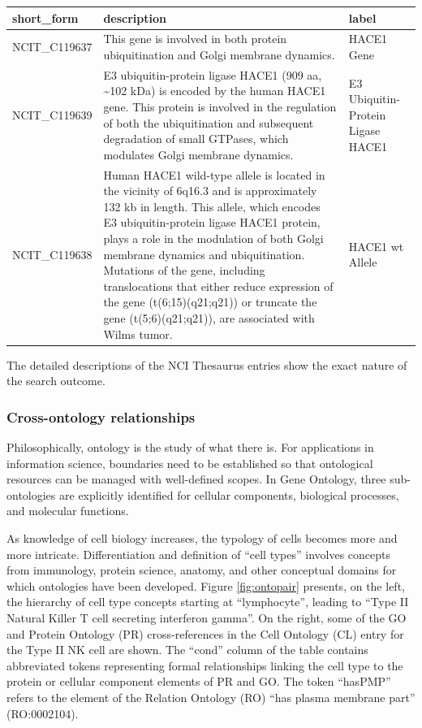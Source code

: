 \begin{tabular}[t]{l>{\raggedright\arraybackslash}p{15em}>{\raggedright\arraybackslash}p{15em}}
\toprule
short\_form & description & label\\
\midrule
NCIT\_C119637 & This gene is involved in both protein ubiquitination and Golgi membrane dynamics. & HACE1 Gene\\
NCIT\_C119639 & E3 ubiquitin-protein ligase HACE1 (909 aa, \textasciitilde{}102 kDa) is encoded by the human HACE1 gene. This protein is involved in the regulation of both the ubiquitination and subsequent degradation of small GTPases, which modulates Golgi membrane dynamics. & E3 Ubiquitin-Protein Ligase HACE1\\
NCIT\_C119638 & Human HACE1 wild-type allele is located in the vicinity of 6q16.3 and is approximately 132 kb in length. This allele, which encodes E3 ubiquitin-protein ligase HACE1 protein, plays a role in the modulation of both Golgi membrane dynamics and ubiquitination. Mutations of the gene, including translocations that either reduce expression of the gene (t(6;15)(q21;q21)) or truncate the gene (t(5;6)(q21;q21)), are associated with Wilms tumor. & HACE1 wt Allele\\
\bottomrule
\end{tabular}

The detailed descriptions of the NCI Thesaurus entries show
the exact nature of the search outcome.

\subsubsection{Cross-ontology relationships}\label{cross-ontology-relationships}

Philosophically, ontology is the study of what there is. For
applications in information
science,
boundaries need to be established so that ontological
resources can be managed with well-defined scopes. In Gene
Ontology, three sub-ontologies are explicitly identified for
cellular components, biological processes, and molecular functions.

As knowledge of cell biology increases, the typology of
cells becomes more and more intricate. Differentiation
and definition
of ``cell types'' involves concepts from immunology,
protein science, anatomy, and other conceptual domains
for which ontologies have been developed. Figure \ref{fig:ontopair}
presents, on the left, the hierarchy of cell type concepts starting at ``lymphocyte'',
leading to ``Type II Natural Killer T cell secreting interferon gamma''.
On the right, some of the GO and Protein Ontology (PR) cross-references
in the Cell Ontology (CL) entry for the Type II NK cell are shown.
The ``cond'' column of the table contains abbreviated tokens
representing formal relationships linking the cell type
to the protein or cellular component elements of PR and GO.
The token ``hasPMP'' refers to the element of the Relation Ontology
(RO) ``has plasma membrane part'' (RO:0002104).


